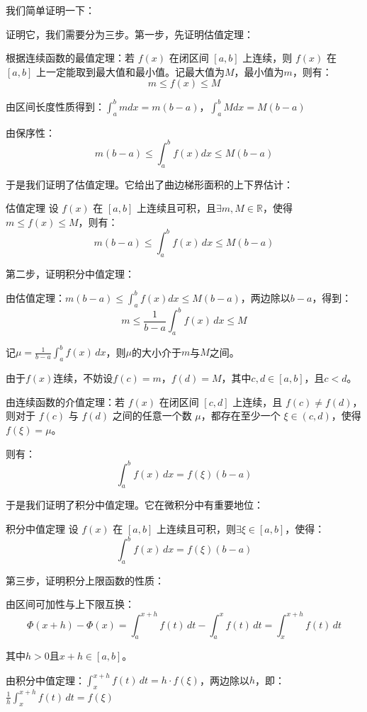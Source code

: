 我们简单证明一下：

证明它，我们需要分为三步。第一步，先证明估值定理：

根据连续函数的最值定理：若 $f(x)$ 在闭区间 $[a,b]$ 上连续，则 $f(x)$ 在 $[a,b]$ 上一定能取到最大值和最小值。记最大值为$M$，最小值为$m$，则有：\[m\leq f(x)\leq M\]

由区间长度性质得到：\(\int_{a}^{b} m dx=m(b-a)\)，\(\int_{a}^{b} M dx=M(b-a)\)

由保序性：\[m(b-a)\leq \int_{a}^{b} f(x) dx\leq M(b-a)\]

于是我们证明了估值定理。它给出了曲边梯形面积的上下界估计：

\begin{theorem}{估值定理}{}
设 $f(x)$ 在 $[a, b]$ 上连续且可积，且$\exists m,M\in \mathbb{R} $，使得$m\leq f(x)\leq M$，则有：
\[
m(b-a)\leq \int_{a}^{b} f(x) \,dx \leq M(b-a)
\]
\end{theorem}

第二步，证明积分中值定理：

由估值定理：\(m(b-a)\leq \int_{a}^{b} f(x) dx\leq M(b-a)\)，两边除以$b-a$，得到：\[
m\leq \frac{1}{b-a} \int_{a}^{b} f(x) \,dx \leq M
\]

记$\mu =\frac{1}{b-a} \int_{a}^{b} f(x) \,dx$，则$\mu$的大小介于$m$与$M$之间。

由于$f(x)$连续，不妨设$f(c)=m$，$f(d)=M$，其中$c,d\in[a,b]$，且$c<d$。

由连续函数的介值定理：若 $f(x)$ 在闭区间 $[c,d]$ 上连续，且 $f(c) \neq f(d)$，则对于 $f(c)$ 与 $f(d)$ 之间的任意一个数 $\mu$，都存在至少一个 $\xi \in (c,d)$，使得 $f(\xi) = \mu$。

则有：\[\int_{a}^{b} f(x) \,dx =f(\xi )(b-a)\]

于是我们证明了积分中值定理。它在微积分中有重要地位：

\begin{theorem}{积分中值定理}{}
设 $f(x)$ 在 $[a, b]$ 上连续且可积，则$\exists \xi \in [a,b]$，使得：
\[\int_{a}^{b} f(x) \,dx =f(\xi )(b-a)\]
\end{theorem}

第三步，证明积分上限函数的性质：

由区间可加性与上下限互换：\[\Phi (x+h)-\Phi (x)=\int_a^{x+h} f(t)\, dt-\int_a^x f(t)\, dt=\int_x^{x+h} f(t)\, dt\]

其中$h>0$且$x+h\in [a,b]$。

由积分中值定理：\(\int_x^{x+h} f(t)\, dt =h \cdot f(\xi )\)，两边除以$h$，即：\(\frac{1}{h} \int_x^{x+h} f(t)\, dt =f(\xi )\)

